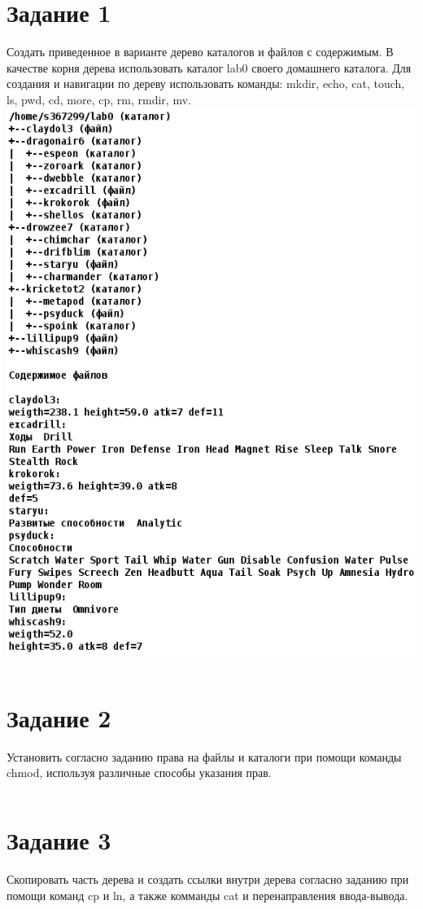 \documentclass[12pt,onecolumn]{article}
\begin{document}
\section{Задание 1}
Создать приведенное в варианте дерево каталогов и файлов с содержимым. В качестве корня дерева использовать каталог lab0 своего домашнего каталога. Для создания и навигации по дереву использовать команды: mkdir, echo, cat, touch, ls, pwd, cd, more, cp, rm, rmdir, mv.\\ 
\includegraphics[width=15cm]{img/1-1.png}
\newpage
\inputminted{sh}{code/1}
\newpage
\section{Задание 2}
Установить согласно заданию права на файлы и каталоги при помощи команды chmod, используя различные способы указания прав.\\
\inputminted{sh}{code/2.sh}
\newpage
\section{Задание 3}
Скопировать часть дерева и создать ссылки внутри дерева согласно заданию при помощи команд cp и ln, а также комманды cat и перенаправления ввода-вывода.
\inputminted{sh}{code/3.sh}
\newpage
\end{document}
